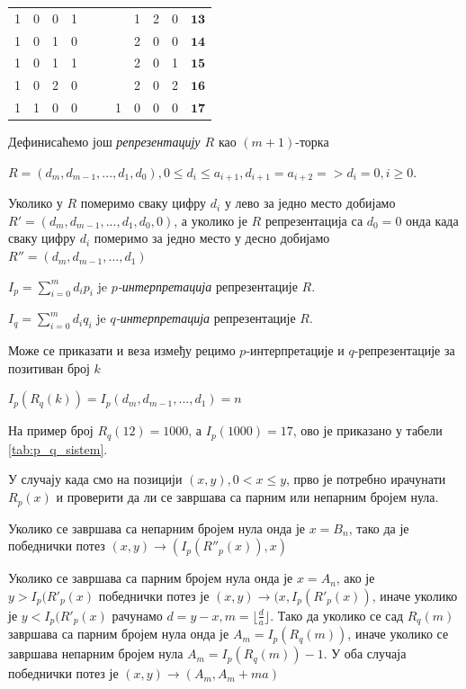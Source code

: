 \documentclass[a4paper]{article}
\begin{document}
\begin{table}[h!]
\begin{center}
\begin{tabular}{ | c | c | c | c | c  c | c | c | c | c | c |}
			 1 & 0 & 0 & 1 & & & & 1 & 2 & 0 &  {$ \mathbf{13} $}\\
			 1 & 0 & 1 & 0 & & & & 2 & 0 & 0 &  {$ \mathbf{14} $}\\
			 1 & 0 & 1 & 1 & & & & 2 & 0 & 1 &  {$ \mathbf{15} $}\\
			 1 & 0 & 2 & 0 & & & & 2 & 0 & 2 &  {$ \mathbf{16} $}\\
			 1 & 1 & 0 & 0 & & & 1 & 0 & 0 & 0 &  {$ \mathbf{17} $}\\
			\hline 
		\end{tabular}
	\end{center}
\end{table}

Дефинисаћемо још \textit{репрезентацију $ R $} као $ (m+1) $-торка 
\begin{center}
	$ R = (d_{m}, d_{m-1}, ... , d_{1}, d_{0}), 0 \le d_{i} \le a_{i+1}, d_{i+1} = a_{i+2} => d_{i} = 0, i \ge 0 $.
\end{center}

Уколико у $ R $ померимо сваку цифру $ d_{i} $ у лево за једно место добијамо $ R' = (d_{m}, d_{m-1}, ... , d_{1}, d_{0}, 0) $, а уколико је $ R $ репрезентација са $ d_{0} = 0 $ онда када сваку цифру $ d_{i} $ померимо за једно место у десно добијамо $ R'' = (d_{m}, d_{m-1}, ... , d_{1}) $ 

$ I_{p} = \sum_{i=0}^{m} d_{i}p_{i} $ je \textit{$ p $-интерпретација} репрезентације $ R $.

$ I_{q} = \sum_{i=0}^{m} d_{i}q_{i} $ je \textit{$ q $-интерпретација} репрезентације $ R $.

Може се приказати и веза између рецимо $ p $-интерпретације и $ q $-репрезентације за позитиван број $ k $
\begin{center}
	$ I_{p}(R_{q}(k)) = I_{p}(d_{m}, d_{m-1}, ..., d_{1}) = n $
\end{center} 

На пример број $ R_{q}(12) = 1000 $, а $ I_{p}(1000) = 17 $, ово је приказано у табели \ref{tab:p_q_sistem}.

У случају када смо на позицији $ (x, y), 0 < x \le y $, прво је потребно ирачунати $ R_{p}(x) $ и проверити да ли се завршава са парним или непарним бројем нула.

Уколико се завршава са непарним бројем нула онда је $ x = B_{n} $, тако да је победнички потез $ (x, y) \rightarrow (I_{p}(R''_{p}(x)), x) $

Уколико се завршава са парним бројем нула онда је $ x = A_{n} $, ако је $ y > I_{p}(R'_{p}(x) $ победнички потез је $ (x, y) \rightarrow (x, I_{p}(R'_{p}(x)) $, иначе уколико је $ y < I_{p}(R'_{p}(x) $ рачунамо $ d = y - x, m = \lfloor \frac{d}{a} \rfloor $. Тако да уколико се сад $ R_{q}(m) $ завршава са парним бројем нула онда је $ A_{m} = I_{p}(R_{q}(m)) $, иначе уколико се завршава непарним бројем нула $ A_{m} = I_{p}(R_{q}(m)) - 1 $. У оба случаја победнички потез је $ (x, y) \rightarrow (A_{m}, A_{m} + ma) $
\end{document}
